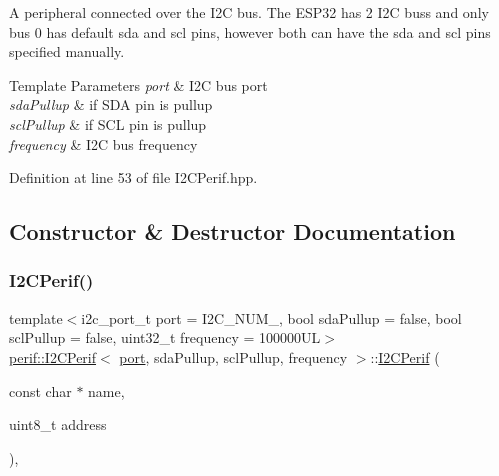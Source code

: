 \begin{DoxyItemize}
\item A peripheral connected over the I2C bus. The E\+S\+P32 has 2 I2C bus\textquotesingle{}s and only bus 0 has default sda and scl pins, however both can have the sda and scl pins specified manually.
\end{DoxyItemize}


\begin{DoxyTemplParams}{Template Parameters}
{\em port} & I2C bus port \\
\hline
{\em sda\+Pullup} & if S\+DA pin is pullup \\
\hline
{\em scl\+Pullup} & if S\+CL pin is pullup \\
\hline
{\em frequency} & I2C bus frequency \\
\hline
\end{DoxyTemplParams}


Definition at line 53 of file I2\+C\+Perif.\+hpp.



\subsection{Constructor \& Destructor Documentation}
\mbox{\label{classperif_1_1I2CPerif_a80ab5e9bf8a8f2f2278a35d646442b1b}} 
\subsubsection{\texorpdfstring{I2CPerif()}{I2CPerif()}}
{\footnotesize\ttfamily template$<$i2c\+\_\+port\+\_\+t port = I2\+C\+\_\+\+N\+U\+M\+\_, bool sda\+Pullup = false, bool scl\+Pullup = false, uint32\+\_\+t frequency = 100000\+UL$>$ \\
\mbox{\hyperlink{classperif_1_1I2CPerif}{perif\+::\+I2\+C\+Perif}}$<$ \mbox{\hyperlink{classI2Cdev_a1d1e63732aa9f50369172b27a034129c}{port}}, sda\+Pullup, scl\+Pullup, frequency $>$\+::\mbox{\hyperlink{classperif_1_1I2CPerif}{I2\+C\+Perif}} (\begin{DoxyParamCaption}\item[{const char $\ast$}]{name,  }\item[{uint8\+\_\+t}]{address }\end{DoxyParamCaption})\hspace{0.3cm}{\ttfamily [inline]}, {\ttfamily [explicit]}}

